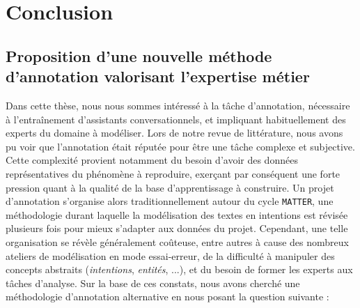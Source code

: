 \chapter{Conclusion}
\label{chapter:6-CONCLUSION}
	
	\section*{Proposition d'une nouvelle méthode d'annotation valorisant l'expertise métier}
	
		Dans cette thèse, nous nous sommes intéressé à la tâche d'annotation, nécessaire à l'entraînement d'assistants conversationnels, et impliquant habituellement des experts du domaine à modéliser.
		Lors de notre revue de littérature, nous avons pu voir que l'annotation était réputée pour être une tâche complexe et subjective.
		Cette complexité provient notamment du besoin d'avoir des données représentatives du phénomène à reproduire, exerçant par conséquent une forte pression quant à la qualité de la base d'apprentissage à construire.
		Un projet d'annotation s'organise alors traditionnellement autour du cycle \texttt{MATTER}, une méthodologie durant laquelle la modélisation des textes en intentions est révisée plusieurs fois pour mieux s'adapter aux données du projet.
		Cependant, une telle organisation se révèle généralement coûteuse, entre autres à cause des nombreux ateliers de modélisation en mode essai-erreur, de la difficulté à manipuler des concepts abstraits (\textit{intentions}, \textit{entités}, ...), et du besoin de former les experts aux tâches d'analyse.
		Sur la base de ces constats, nous avons cherché une méthodologie d'annotation alternative en nous posant la question suivante : 
		
